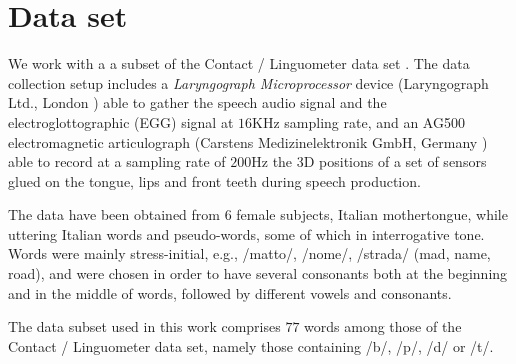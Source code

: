 \section{Data set}
\label{sec:dataset}

We work with a a subset of the Contact / Linguometer data
set \cite{tavella}. The data collection setup includes a
\emph{Laryngograph Microprocessor} device (Laryngograph Ltd.,
London \cite{...}) able to gather the speech audio signal
and the electroglottographic (EGG) signal at $16$KHz sampling
rate, and an AG500 electromagnetic articulograph (Carstens
Medizinelektronik GmbH, Germany \cite{...}) able to
record at a sampling rate of $200$Hz the 3D positions of a set
of sensors glued on the tongue, lips and front teeth during
speech production.

The data have been obtained from $6$ female subjects, Italian
mothertongue, while uttering Italian words and pseudo-words,
some of which in interrogative tone. Words were mainly
stress-initial, e.g., /matto/, /nome/, /strada/ (mad, name,
road), and were chosen in order to have several consonants
both at the beginning and in the middle of words, followed
by different vowels and consonants.

The data subset used in this work comprises $77$ words among
those of the Contact / Linguometer data set, namely those containing
/b/, /p/, /d/ or /t/.
